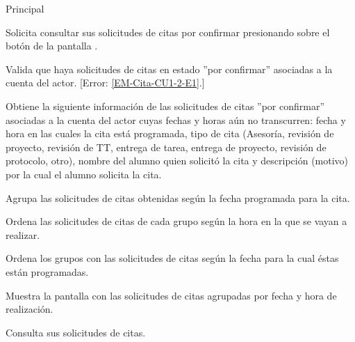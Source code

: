 \begin{UCtrayectoria}{Principal}

	\UCpaso [\UCactor] Solicita consultar sus solicitudes de citas por confirmar presionando sobre el botón  de la pantalla .

	\UCpaso Valida que haya solicitudes de citas en estado ''por confirmar'' asociadas a la cuenta del actor. [Error: \ref{EM-Cita-CU1-2-E1}.]

	\UCpaso Obtiene la siguiente información de las solicitudes de citas ''por confirmar'' asociadas a la cuenta del actor cuyas fechas y horas aún no transcurren: fecha y hora en las cuales la cita está programada, tipo de cita (Asesoría, revisión de proyecto, revisión de TT, entrega de tarea, entrega de proyecto, revisión de protocolo, otro), nombre del alumno quien solicitó la cita y descripción (motivo) por la cual el alumno solicita la cita.

	\UCpaso Agrupa las solicitudes de citas obtenidas según la fecha programada para la cita.

	\UCpaso Ordena las solicitudes de citas de cada grupo según la hora en la que se vayan a realizar. 

	\UCpaso Ordena los grupos con las solicitudes de citas según la fecha para la cual éstas están programadas.

	\UCpaso Muestra la pantalla  con las solicitudes de citas agrupadas por fecha y hora de realización. 

	\UCpaso [\UCactor] Consulta sus solicitudes de citas. 

\end{UCtrayectoria}
